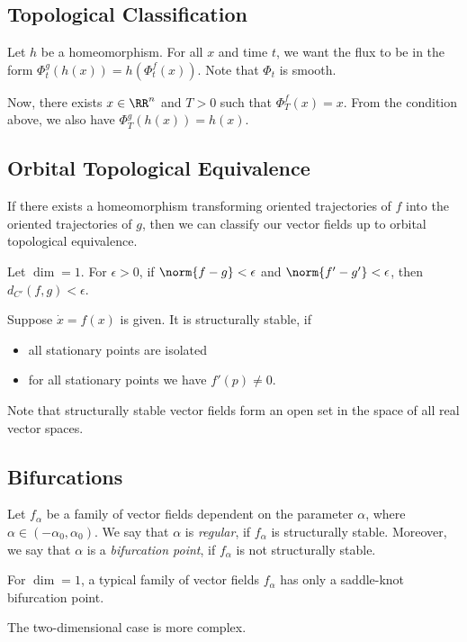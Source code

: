 \documentclass[11pt]{scrartcl}
\begin{document}
  \subsection{Topological Classification}

  Let $h$ be a homeomorphism. For all $x$ and time $t$, we want the
  flux to be in the form $\Phi_{t}^{g}(h(x)) = h(\Phi^{f}_{t}(x))$.
  Note that $\Phi_{t}$ is smooth.

  Now, there exists $x\in \RR^{n}$ and $T > 0$ such that
  $\Phi_{T}^{f}(x) = x$. From the condition above, we also have
  $\Phi_{T}^{g}(h(x)) = h(x)$.

  \subsection{Orbital Topological Equivalence}

  If there exists a homeomorphism transforming oriented trajectories
  of $f$ into the oriented trajectories of $g$, then we can classify
  our vector fields up to orbital topological equivalence.

  \begin{example}

    Let $\dim = 1$. For $\epsilon > 0$, if $\norm{f- g} < \epsilon$
    and $\norm{f' - g '} < \epsilon$, then $d_{C'}(f, g) < \epsilon$.

  \end{example}

  \begin{theorem}
    Suppose $\dot{x} = f(x)$ is given. It is structurally stable, if
    \begin{itemize}
    \item all stationary points are isolated
    \item for all stationary points we have $f'(p) \neq 0$.
    \end{itemize}
  \end{theorem}

  \begin{note*}
    Note that structurally stable vector fields form an open set in
    the space of all real vector spaces.
  \end{note*}

  \subsection{Bifurcations}

  Let $f_{\alpha}$ be a family of vector fields dependent on the
  parameter $\alpha$, where $\alpha \in (- \alpha_{0}, \alpha_{0})$.
  We say that $\alpha$ is \textit{regular}, if $f_{\alpha}$ is structurally
  stable. Moreover, we say that $\alpha$ is a \textit{bifurcation point}, if
  $f_{\alpha}$ is not structurally stable.

  \begin{theorem}
    For $\dim = 1$, a typical family of vector fields $f_{\alpha}$ has
    only a saddle-knot bifurcation point.
  \end{theorem}

  The two-dimensional case is more complex.

  
\end{document}
